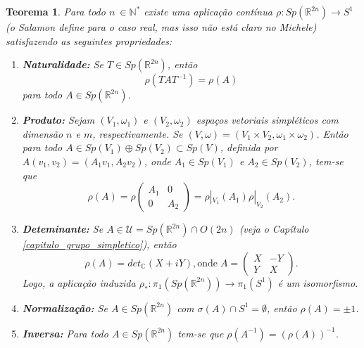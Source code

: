 \documentclass[12pt]{book}
\newtheorem{teorema}{Teorema}[section]
\newcommand{\circulo}{S^{1}}
\newcommand{\complexo}[1]{\mathbb{C}^{#1}}
\newcommand{\grupofundamental}[1]{\pi_{1}(#1)}
\newcommand{\gruposimpletico}[1]{Sp(#1)}
\newcommand{\matrizortogonal}[1]{O(#1)}
\newcommand{\matrizSimpleticaOrtogonal}{\mathcal{U}}
\newcommand{\real}[1]{\mathbb{R}^{#1}}
\newcommand{\alerta}[1]{{\color{red}#1}}
\begin{document}
	\begin{teorema}\label{teorema_aplicacao_rho}
		Para todo $n\ \in \mathbb{N}^{*}$ existe uma aplicação contínua $\rho:\gruposimpletico{\real{2n}} \to S^{1}$ \alerta{(o Salamon define para o caso real, mas isso não está claro no Michele)} satisfazendo as seguintes propriedades:
		\begin{enumerate}
			\item \label{item_naturalidade_rho} \textbf{Naturalidade:}  Se $T\in \gruposimpletico{\real{2n}}$, então 
			$$
			\rho(TAT^{-1}) = \rho(A)
			$$
			para todo $A\in \gruposimpletico{\real{2n}}$.
			
			\item \label{item_produto_rho} \textbf{Produto:} Sejam $(V_{1}, \omega_{1})$ e $(V_{2}, \omega_{2})$ espaços vetoriais simpléticos com dimensão $n$ e $m$, respectivamente. Se $(V,\omega) = (V_{1}\times V_{2},\omega_{1}\times \omega_{2})$. Então para todo $A \in \gruposimpletico{V_{1}}\oplus\gruposimpletico{V_{2}} \subset \gruposimpletico{V}$,  definida por $A(v_{1}, v_{2})=(A_{1}v_{1}, A_{2}v_{2})$, onde $A_{1} \in \gruposimpletico{V_{1}}$ e $A_{2} \in \gruposimpletico{V_{2}}$, tem-se que
			$$
			\rho(A) = \rho 
			\left(
				\begin{array}{cc}
				A_{1} & 0
				\\
				0 & A_{2}
				\end{array} 
			\right)
			= \rho|_{V_{1}}(A_{1})\rho|_{V_{2}}(A_{2}).
			$$
			
			\item \label{item_determinante_rho} \textbf{Deteminante:} Se $A\in \matrizSimpleticaOrtogonal= \gruposimpletico{\real{2n}}\cap \matrizortogonal{2n}$ (veja o Capítulo \ref{capitulo_grupo_simpletico}), então 
			$$
			\rho(A) = det_{\complexo{}}(X+iY), \text{onde} \;	
			A=\left(
			\begin{array}{cc}
			X & -Y					\\
			Y & X
			\end{array}
			\right).
			$$
			Logo, a aplicação induzida $\rho_{*}: \grupofundamental{\gruposimpletico{\real{2n}}} \to \grupofundamental{\circulo}$ é um isomorfismo.
			
			\item \label{item_normalizacao_rho} \textbf{Normalização:} Se $A \in \gruposimpletico{\real{2n}}$ com $\sigma(A)\cap \circulo = \emptyset$, então $\rho(A) = \pm 1$.
			
			\item \label{item_inversa_rho} \textbf{Inversa:} Para todo $A \in \gruposimpletico{\real{2n}}$ tem-se que $\rho(A^{-1})=(\rho(A))^{-1}$. 
		\end{enumerate}
	\end{teorema}
	
\end{document}
